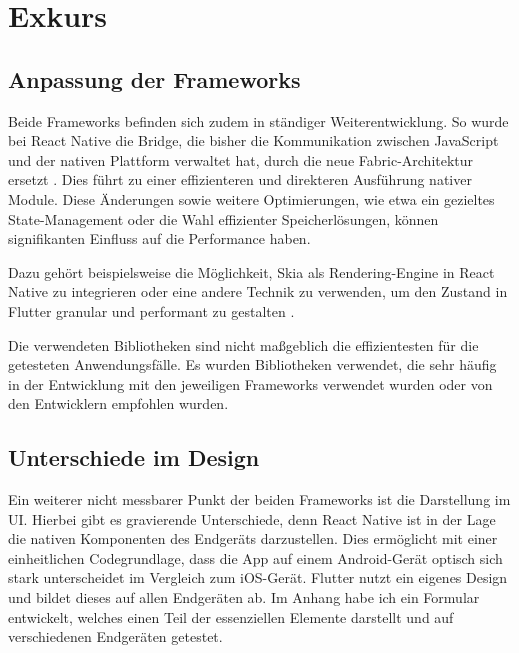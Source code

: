 \section{Exkurs}
\subsection{Anpassung der Frameworks}
Beide Frameworks befinden sich zudem in ständiger Weiterentwicklung. So wurde bei React Native die Bridge, die bisher die Kommunikation zwischen JavaScript und der nativen Plattform verwaltet hat, durch die neue Fabric-Architektur ersetzt \cite{ReactNativeNewArchitecture}. Dies führt zu einer effizienteren und direkteren Ausführung nativer Module. Diese Änderungen sowie weitere Optimierungen, wie etwa ein gezieltes State-Management oder die Wahl effizienter Speicherlösungen, können signifikanten Einfluss auf die Performance haben.

\vspace{0.5cm}

Dazu gehört beispielsweise die Möglichkeit, Skia \cite{ReactNativeSkia} als Rendering-Engine in React Native zu integrieren oder eine andere Technik zu verwenden, um den Zustand in Flutter granular und performant zu gestalten \cite{FlutterBloc}.

\vspace{0.5cm}

Die verwendeten Bibliotheken sind nicht maßgeblich die effizientesten für die getesteten Anwendungsfälle. Es wurden Bibliotheken verwendet, die sehr häufig in der Entwicklung mit den jeweiligen Frameworks verwendet wurden oder von den Entwicklern empfohlen wurden.

\subsection{Unterschiede im Design}
Ein weiterer nicht messbarer Punkt der beiden Frameworks ist die Darstellung im UI. Hierbei gibt es gravierende Unterschiede, denn React Native ist in der Lage die nativen Komponenten des Endgeräts darzustellen. Dies ermöglicht mit einer einheitlichen Codegrundlage, dass die App auf einem Android-Gerät optisch sich stark unterscheidet im Vergleich zum iOS-Gerät. Flutter nutzt ein eigenes Design und bildet dieses auf allen Endgeräten ab. Im Anhang habe ich ein Formular entwickelt, welches einen Teil der essenziellen Elemente darstellt und auf verschiedenen Endgeräten getestet.